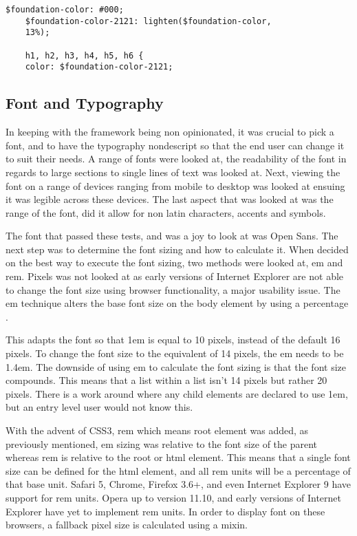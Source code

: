 \begin{lstlisting}[language=CSS3]
	$foundation-color: #000;
	$foundation-color-2121: lighten($foundation-color, 
	13%);

	h1, h2, h3, h4, h5, h6 {
  	color: $foundation-color-2121;
\end{lstlisting}

\subsection*{Font and Typography}
In keeping with the framework being non opinionated, it was crucial to pick a font, and to have the typography nondescript so that the end user can change it to suit their needs. A range of fonts were looked at, the readability of the font in regards to large sections to single lines of text was looked at. Next, viewing the font on a range of devices ranging from mobile to desktop was looked at ensuing it was legible across these devices. The last aspect that was looked at was the range of the font, did it allow for non latin characters, accents and symbols\cite{WORD16}.

The font that passed these tests, and was a joy to look at was Open Sans. The next step was to determine the font sizing and how to calculate it. When decided on the best way to execute the font sizing, two methods were looked at, em and rem. Pixels was not looked at as early versions of Internet Explorer are not able to change the font size using browser functionality, a major usability issue. The em technique alters the base font size on the body element by using a percentage \cite{GUN16}.

This adapts the font so that 1em is equal to 10 pixels, instead of the default 16 pixels. To change the font size to the equivalent of 14 pixels, the em needs to be 1.4em. The downside of using em to calculate the font sizing is that the font size compounds. This means that a list within a list isn't 14 pixels but rather 20 pixels. There is a work around where any child elements are declared to use 1em, but an entry level user would not know this. 

With the advent of CSS3, rem which means root element was added, as previously mentioned, em sizing was relative to the font size of the parent whereas rem is relative to the root or html element. This means that a single font size can be defined for the html element, and all rem units will be a percentage of that base unit. Safari 5, Chrome, Firefox 3.6+, and even Internet Explorer 9 have support for rem units. Opera up to version 11.10, and early versions of Internet Explorer have yet to implement rem units. In order to display font on these browsers, a fallback pixel size is calculated using a mixin. 

